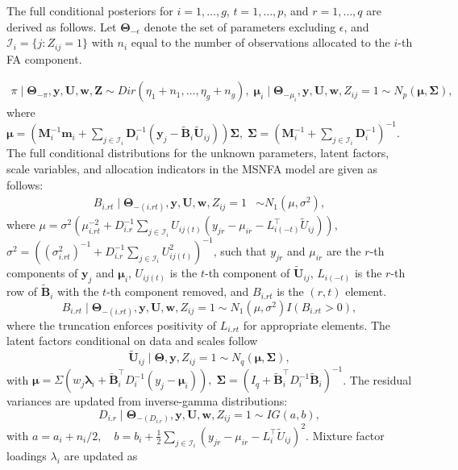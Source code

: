 \documentclass[twoside]{article}
\theoremstyle{definition}
\begin{document}
The full conditional posteriors for $i = 1, \dots, g$, $t=1,\dots,p$, and $r=1,\dots,q$ are derived as follows. Let $\bm\Theta_{-\epsilon}$ denote the set of parameters excluding $\epsilon$, and $\mathcal{I}_i = \{ j: Z_{ij} = 1\}$ with $n_i$ equal to the number of observations allocated to the $i$-th FA component.

\begin{align*}
	\pi \mid \bm\Theta_{-\pi}, \bm y, \bm U, \bm w, \bm Z \sim Dir(\eta_1 + n_1, \dots, \eta_g + n_g),\; \bm\mu_i \mid \bm\Theta_{-\mu_i}, \bm y, \bm U, \bm w, Z_{ij}=1 \sim N_p(\bm \mu, \bm \Sigma),
\end{align*}
where $\bm \mu = \left( \bm M_i^{-1} \bm m_i + \sum_{j \in \mathcal{I}_i} \bm D_i^{-1} (\bm y_j - \tilde{\bm B}_i \tilde{\bm U}_{ij}) \right) \bm \Sigma, 
\;
\bm \Sigma = \left( \bm M_i^{-1} + \sum_{j \in \mathcal{I}_i} \bm D_i^{-1} \right)^{-1}.$
The full conditional distributions for the unknown parameters, latent factors, scale variables, and allocation indicators in the MSNFA model are given as follows:
\begin{align}
	B_{i.rt} \mid \bm\Theta_{-(i.rt)}, \bm y, \bm U, \bm w, Z_{ij}=1 &\sim N_1(\mu, \sigma^2),
\end{align}
where  $\mu = \sigma^2 \left( \mu_{i.rt}^{-2} + D_{i.r}^{-1} \sum_{j \in \mathcal{I}_i} U_{ij(t)} (y_{jr} - \mu_{ir} - L_{i(-t)}^\top \tilde{U}_{ij}) \right)$, 
	$\sigma^2 = \left( (\sigma_{i.rt}^2)^{-1} + D_{i.r}^{-1} \sum_{j \in \mathcal{I}_i} U_{ij(t)}^2 \right)^{-1}$, such that $y_{jr}$ and $\mu_{ir}$ are the $r$-th components of $\bm y_j$ and $\bm \mu_i$, $U_{ij(t)}$ is the $t$-th component of $\tilde{\bm U}_{ij}$, $L_{i(-t)}$ is the $r$-th row of $\tilde{\bm B}_i$ with the $t$-th component removed, and $B_{i.rt}$ is the $(r,t)$ element.
\[
B_{i.rt} \mid \bm\Theta_{-(i.rt)}, \bm y, \bm U, \bm w, Z_{ij}=1 \sim N_1(\mu, \sigma^2) I(B_{i.rt}>0),
\]
where the truncation enforces positivity of $L_{i.rt}$ for appropriate elements. The latent factors conditional on data and scales follow
\[
\tilde{\bm U}_{ij} \mid \bm\Theta, \bm y, Z_{ij}=1 \sim N_q(\bm \mu, \bm \Sigma),
\]
with $\bm \mu = \Sigma \left( w_j \bm \lambda_i + \tilde{\bm B}_i^\top D_i^{-1} (y_j - \bm\mu_i) \right), \;
\bm \Sigma = \left( I_q + \tilde{\bm B}_i^\top D_i^{-1} \tilde{\bm B}_i \right)^{-1}$. The residual variances are updated from inverse-gamma distributions:
\[
D_{i.r} \mid \bm\Theta_{-(D_{i.r})}, \bm y, \bm U, \bm w, Z_{ij}=1 \sim IG(a,b),
\]
with $a = a_i + n_i/2, \quad b = b_i + \frac{1}{2} \sum_{j \in \mathcal{I}_i} (y_{jr} - \mu_{ir} - L_{i}^\top \tilde{U}_{ij})^2$. Mixture factor loadings $\lambda_i$ are updated as
\end{document}

